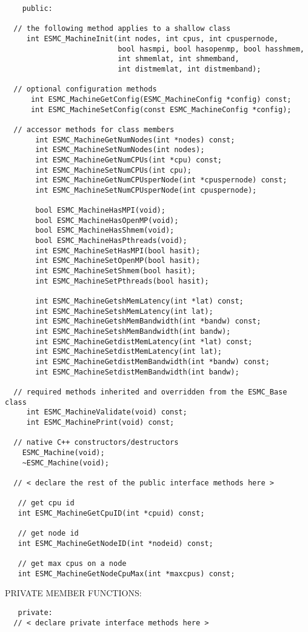 \begin{verbatim}    public:
 
  // the following method applies to a shallow class
     int ESMC_MachineInit(int nodes, int cpus, int cpuspernode,
                          bool hasmpi, bool hasopenmp, bool hasshmem,
                          int shmemlat, int shmemband,
                          int distmemlat, int distmemband);
 
  // optional configuration methods
      int ESMC_MachineGetConfig(ESMC_MachineConfig *config) const;
      int ESMC_MachineSetConfig(const ESMC_MachineConfig *config);
 
  // accessor methods for class members
       int ESMC_MachineGetNumNodes(int *nodes) const;
       int ESMC_MachineSetNumNodes(int nodes);
       int ESMC_MachineGetNumCPUs(int *cpu) const;
       int ESMC_MachineSetNumCPUs(int cpu);
       int ESMC_MachineGetNumCPUsperNode(int *cpuspernode) const;
       int ESMC_MachineSetNumCPUsperNode(int cpuspernode);
 
       bool ESMC_MachineHasMPI(void);
       bool ESMC_MachineHasOpenMP(void);
       bool ESMC_MachineHasShmem(void);
       bool ESMC_MachineHasPthreads(void);
       int ESMC_MachineSetHasMPI(bool hasit);
       int ESMC_MachineSetOpenMP(bool hasit);
       int ESMC_MachineSetShmem(bool hasit);
       int ESMC_MachineSetPthreads(bool hasit);
 
       int ESMC_MachineGetshMemLatency(int *lat) const;
       int ESMC_MachineSetshMemLatency(int lat);
       int ESMC_MachineGetshMemBandwidth(int *bandw) const;
       int ESMC_MachineSetshMemBandwidth(int bandw);
       int ESMC_MachineGetdistMemLatency(int *lat) const;
       int ESMC_MachineSetdistMemLatency(int lat);
       int ESMC_MachineGetdistMemBandwidth(int *bandw) const;
       int ESMC_MachineSetdistMemBandwidth(int bandw);
     
  // required methods inherited and overridden from the ESMC_Base class
     int ESMC_MachineValidate(void) const;
     int ESMC_MachinePrint(void) const;
 
  // native C++ constructors/destructors
 	ESMC_Machine(void);
 	~ESMC_Machine(void);
   
  // < declare the rest of the public interface methods here >
 
   // get cpu id
   int ESMC_MachineGetCpuID(int *cpuid) const;
 
   // get node id
   int ESMC_MachineGetNodeID(int *nodeid) const;
 
   // get max cpus on a node
   int ESMC_MachineGetNodeCpuMax(int *maxcpus) const;
   \end{verbatim}{\sf PRIVATE MEMBER FUNCTIONS:}
\begin{verbatim}   private: 
  // < declare private interface methods here >\end{verbatim}

